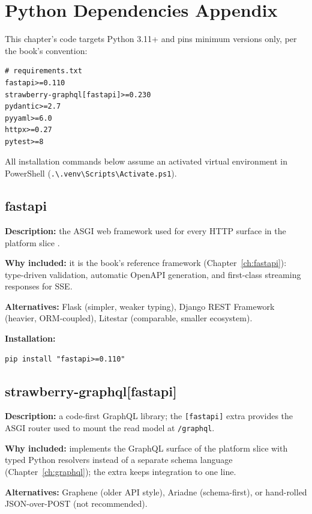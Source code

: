 \section{Python Dependencies Appendix}

This chapter's code targets Python 3.11+ and pins minimum versions only,
per the book's convention:

\begin{verbatim}
# requirements.txt
fastapi>=0.110
strawberry-graphql[fastapi]>=0.230
pydantic>=2.7
pyyaml>=6.0
httpx>=0.27
pytest>=8
\end{verbatim}

All installation commands below assume an activated virtual environment in
PowerShell (\texttt{.\textbackslash{}.venv\textbackslash{}Scripts\textbackslash{}Activate.ps1}).

\subsection{fastapi}

\textbf{Description:} the ASGI web framework used for every HTTP surface in
the platform slice \cite{fastapidocs}.

\textbf{Why included:} it is the book's reference framework
(Chapter~\ref{ch:fastapi}): type-driven validation, automatic OpenAPI
generation, and first-class streaming responses for SSE.

\textbf{Alternatives:} Flask (simpler, weaker typing), Django REST Framework
(heavier, ORM-coupled), Litestar (comparable, smaller ecosystem).

\textbf{Installation:}
\begin{verbatim}
pip install "fastapi>=0.110"
\end{verbatim}

\subsection{strawberry-graphql[fastapi]}

\textbf{Description:} a code-first GraphQL library; the
\texttt{[fastapi]} extra provides the ASGI router used to mount the read
model at \texttt{/graphql}.

\textbf{Why included:} implements the GraphQL surface of the platform slice
with typed Python resolvers instead of a separate schema language
(Chapter~\ref{ch:graphql}); the extra keeps integration to one line.

\textbf{Alternatives:} Graphene (older API style), Ariadne (schema-first),
or hand-rolled JSON-over-POST (not recommended).

